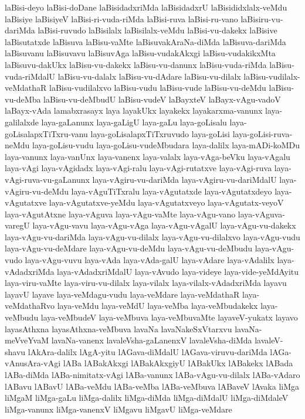 {laBisi-deyo
laBisi-doDane
laBisidadxriMda
laBisidadxrU
laBisididxlalx-veMdu
laBisiye
laBisiyeV
laBisi-ri-vuda-riMda
laBisi-ruva
laBisi-ru-vano
laBisiru-vu-dariMda
laBisi-ruvudo
laBisilalx
laBisilalx-veMdu
laBisi-vu-dakekx
laBisive
laBisutatxde
laBisuva
laBisu-vaMte
laBisuvakAraNa-diMda
laBisuva-dariMda
laBisuvanu
laBisuvavu
laBisuvAga
laBisu-vudakAkxgi
laBisu-vudakikxMta
laBisuvu-dakUkx
laBisu-vu-dakekx
laBisu-vu-danunx
laBisu-vuda-riMda
laBisu-vuda-riMdalU
laBisu-vu-dalalx
laBisu-vu-dAdare
laBisu-vu-dilalx
laBisu-vudilalx-veMdathaR
laBisu-vudilalxvo
laBisu-vudu
laBisu-vude
laBisu-vu-deMdu
laBisu-vu-deMba
laBisu-vu-deMbudU
laBisu-vudeV
laBayxteV
laBayx-vAgu-vadoV
laBayx-vAda
lamabxrasayx
laya
layakUkx
layakekx
layakarxma-vanunx
laya-galilalxde
laya-gaLanunx
laya-gaLigU
laya-gaLu
laya-goLisalu
laya-goLisalapxTiTxru-vanu
laya-goLisalapxTiTxruvudo
laya-goLisi
laya-goLisi-ruva-neMdu
laya-goLisu-vudu
laya-goLisu-vudeMbudara
laya-dalilx
laya-mADi-koMDu
laya-vanunx
laya-vanUnx
laya-vanenx
laya-valalx
laya-vAga-beVku
laya-vAgalu
laya-vAgi
laya-vAgidadx
laya-vAgi-ralu
laya-vAgi-rutatxve
laya-vAgi-ruva
laya-vAgi-ruva-vu-gaLanunx
laya-vAgiru-vu-dariMda
laya-vAgiru-vu-dariMdalU
laya-vAgiru-vu-deMdu
laya-vAguTiTxralu
laya-vAgutatxde
laya-vAgutatxdeyo
laya-vAgutatxve
laya-vAgutatxve-yeMdu
laya-vAgutatxveyo
laya-vAgutatx-veyoV
laya-vAgutAtxne
laya-vAguva
laya-vAgu-vaMte
laya-vAgu-vano
laya-vAguva-varegU
laya-vAgu-vavu
laya-vAgu-vAga
laya-vAgu-vAgalU
laya-vAgu-vu-dakekx
laya-vAgu-vu-dariMda
laya-vAgu-vu-dilalx
laya-vAgu-vu-dilalxvo
laya-vAgu-vudu
laya-vAgu-vu-deMdare
laya-vAgu-vu-deMdu
laya-vAgu-vu-deMbudu
laya-vAgu-vudo
laya-vAgu-vuvu
laya-vAda
laya-vAda-galU
laya-vAdare
laya-vAdalilx
laya-vAdadxriMda
laya-vAdadxriMdalU
laya-vAvudo
laya-videye
laya-vide-yeMdAyitu
laya-viru-vaMte
laya-viru-vu-dilalx
laya-vilalx
laya-vilalx-vAdadxriMda
layavu
layavU
layave
laya-veMdagu-vudu
laya-veMdare
laya-veMdathaR
laya-veMdathaRvo
laya-veMdu
laya-veMdU
laya-veMba
laya-veMbudakekx
laya-veMbudu
laya-veMbudeV
laya-veMbuva
laya-veMbuvaMte
layaveV-yukatx
layavo
layasAthxna
layasAthxna-veMbuva
lavaNa
lavaNakeSxVtarxvu
lavaNa-meVveYvaM
lavaNa-vanenx
lavaleVsha-gaLanenxV
lavaleVsha-diMda
lavaleV-shavu
lAkAra-dalilx
lAgA-yitu
lAGava-diMdalU
lAGava-viruvu-dariMda
lAGa-vAnusAra-vAgi
lABa
lABakAkxgi
lABakAkxgiyU
lABakUkx
lABakekx
lABada
lABa-diMda
lABa-nimitatx-vAgi
lABa-vanunx
lABa-vAgu-vu-dilalx
lABa-vAdaro
lABavu
lABavU
lABa-veMdu
lABa-veMba
lABa-veMbuva
lABaveV
lAvaka
liMga
liMgaM
liMga-gaLu
liMga-dalilx
liMga-diMda
liMga-diMdalU
liMga-diMdaleV
liMga-vanunx
liMga-vanenxV
liMgavu
liMgavU
liMga-veMdare
}
